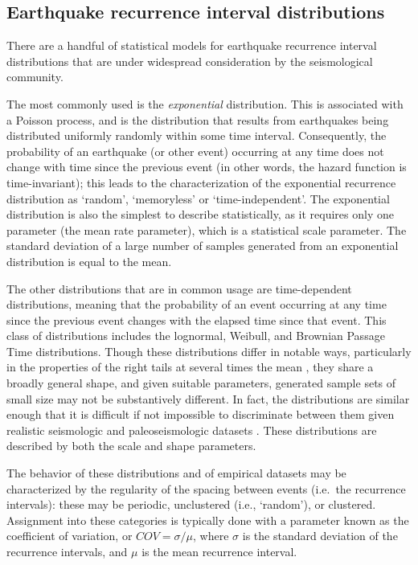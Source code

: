 \documentclass[se, manuscript]{copernicus}
\begin{document}
\subsection{Earthquake recurrence interval
distributions}\label{earthquake-recurrence-interval-distributions}

There are a handful of statistical models for earthquake recurrence
interval distributions that are under widespread consideration by the
seismological community.

The most commonly used is the \emph{exponential} distribution. This is
associated with a Poisson process, and is the distribution that results
from earthquakes being distributed uniformly randomly within some time interval.
Consequently, the probability of an earthquake (or other event) occurring at any
time does not change with time since the previous event (in other words, the
hazard function is time-invariant); this leads to the characterization of the
exponential recurrence distribution as `random', `memoryless' or
`time-independent'. The exponential distribution is also the simplest to
describe statistically, as it requires only one parameter (the mean rate
parameter), which is a statistical scale parameter. The standard deviation of a
large number of samples generated from an exponential distribution is equal to
the mean.

The other distributions that are in common usage are time-dependent
distributions, meaning that the probability of an event occurring at any
time since the previous event changes with the elapsed time since that
event. This class of distributions includes the lognormal, Weibull, and
Brownian Passage Time \citep{matthews_brownian_2002} distributions.
Though these distributions differ in notable ways, particularly in the
properties of the right tails at several times the mean
\citep{davis_longer_1989,matthews_brownian_2002}, they share a broadly
general shape, and given suitable parameters, generated sample sets of
small size may not be substantively different. In fact, the
distributions are similar enough that it is difficult if not impossible
to discriminate between them given realistic seismologic and
paleoseismologic datasets
\citep{matthews_brownian_2002,ogata_estimating_1999}. These
distributions are described by both the scale and shape parameters.

The behavior of these distributions and of empirical datasets may be
characterized by the regularity of the spacing between events (i.e.~the
recurrence intervals): these may be periodic, unclustered (i.e.,
`random'), or clustered. Assignment into these categories is typically
done with a parameter known as the coefficient of variation, or
\(COV = \sigma / \mu\), where \(\sigma\) is the standard deviation of
the recurrence intervals, and \(\mu\) is the mean recurrence interval.
\end{document}
